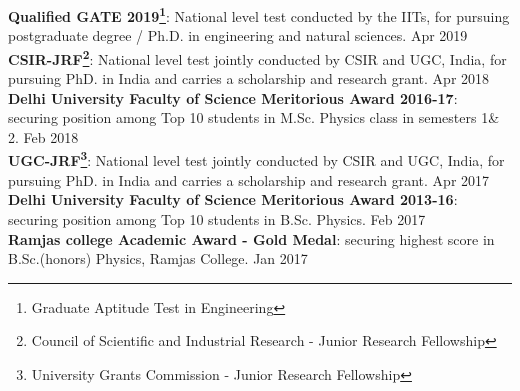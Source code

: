 {\bf Qualified GATE 2019\footnote{Graduate Aptitude Test in Engineering}}: National level test conducted by the IITs, for pursuing postgraduate degree / Ph.D. in engineering and natural sciences. \hfill{Apr 2019} \\

{\bf CSIR-JRF\footnote{Council of Scientific and Industrial Research - Junior Research Fellowship}}: National level test jointly conducted by CSIR and UGC, India, for pursuing PhD. in India and carries a scholarship and research grant. \hfill{Apr 2018} \\

{\bf Delhi University Faculty of Science Meritorious Award 2016-17}: securing position among Top 10 students in M.Sc. Physics class in semesters 1\& 2. \hfill{Feb 2018} \\

{\bf UGC-JRF\footnote{University Grants Commission - Junior Research Fellowship}}: National level test jointly conducted by CSIR and UGC, India, for pursuing PhD. in India and carries a scholarship and research grant. \hfill{Apr 2017} \\

{\bf Delhi University Faculty of Science Meritorious Award 2013-16}: securing position among Top 10 students in B.Sc. Physics. \hfill{Feb 2017} \\

{\bf Ramjas college Academic Award - Gold Medal}: securing highest score in B.Sc.(honors) Physics, Ramjas College. \hfill{Jan 2017}